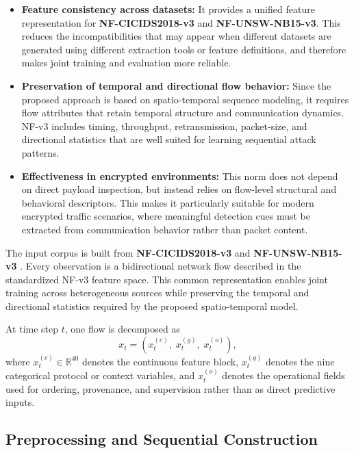 \documentclass[12pt, a4paper]{report}
\begin{document}
\begin{itemize}
    \item \textbf{Feature consistency across datasets:}  
   It provides a unified feature representation for \textbf{NF-CICIDS2018-v3} and \textbf{NF-UNSW-NB15-v3}. This reduces the incompatibilities that may appear when different datasets are generated using different extraction tools or feature definitions, and therefore makes joint training and evaluation more reliable.

    \item \textbf{Preservation of temporal and directional flow behavior:}  
    Since the proposed approach is based on spatio-temporal sequence modeling, it requires flow attributes that retain temporal structure and communication dynamics. NF-v3 includes timing, throughput, retransmission, packet-size, and directional statistics that are well suited for learning sequential attack patterns.

    \item \textbf{Effectiveness in encrypted environments:}  
    This norm does not depend on direct payload inspection, but instead relies on flow-level structural and behavioral descriptors. This makes it particularly suitable for modern encrypted traffic scenarios, where meaningful detection cues must be extracted from communication behavior rather than packet content.
\end{itemize}



The input corpus is built from \textbf{NF-CICIDS2018-v3} \cite{NF3_IDS2018} and \textbf{NF-UNSW-NB15-v3} \cite{NF-UNSW-NB15-v3}. Every observation is a bidirectional network flow described in the standardized NF-v3 feature space. This common representation enables joint training across heterogeneous sources while preserving the temporal and directional statistics required by the proposed spatio-temporal model.

At time step $t$, one flow is decomposed as
\begin{equation}
x_t = \left(x_t^{(c)},\; x_t^{(g)},\; x_t^{(o)}\right),
\end{equation}
where $x_t^{(c)} \in \mathbb{R}^{40}$ denotes the continuous feature block, $x_t^{(g)}$ denotes the nine categorical protocol or context variables, and $x_t^{(o)}$ denotes the operational fields used for ordering, provenance, and supervision rather than as direct predictive inputs.

\subsection{Preprocessing and Sequential Construction}
\end{document}
